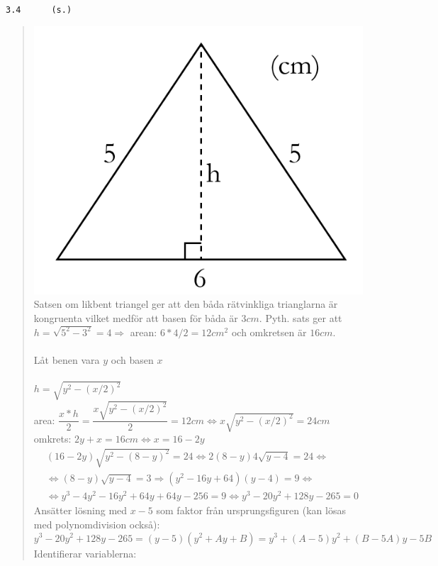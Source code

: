 \documentclass[a4paper]{article}
\newcommand{\tskcol}[1]{\textcolor{tskcol}{#1}}
\begin{document}
	\pagebreak	
	\texttt{\tskcol{3.4~~~~~ (s.)}}
	\begin{quotation}
		\noindent
		\includegraphics[scale=0.3]{images/34.png} \\
		Satsen om likbent triangel ger att den båda rätvinkliga trianglarna är kongruenta vilket medför att basen för båda är $3cm$.
		Pyth. sats ger att $h=\sqrt{5^2-3^2}=4 \Rightarrow$ arean: $6*4/2=12cm^2$ och omkretsen är $16cm$. \\ \\
		Låt benen vara $y$ och basen $x$ \\ \\
		$h=\sqrt{y^2-(x/2)^2}$ \\
		area: $\dfrac{x*h}{2}=\dfrac{x\sqrt{y^2-(x/2)^2}}{2}=12cm \Leftrightarrow x\sqrt{y^2-(x/2)^2}=24cm$ \\
		omkrets: $2y+x=16cm \Leftrightarrow x=16-2y$
		\begin{align*}
		&(16-2y)\sqrt{y^2-(8-y)^2}=24 \Leftrightarrow
		2(8-y)4\sqrt{y-4}=24 \Leftrightarrow \\
		&\Leftrightarrow (8-y)\sqrt{y-4}=3 \Rightarrow
		(y^2-16y+64)(y-4)=9 \Leftrightarrow \\
		&\Leftrightarrow y^3-4y^2-16y^2+64y+64y-256=9 \Leftrightarrow
		y^3-20y^2+128y-265=0
		\end{align*}
		Ansätter lösning med $x-5$ som faktor från ursprungsfiguren (kan lösas med polynomdivision också): \\
		\[y^3-20y^2+128y-265=(y-5)(y^2+Ay+B)=y^3+(A-5)y^2+(B-5A)y-5B\]
		Identifierar variablerna: \\

\end{quotation}
\end{document}
